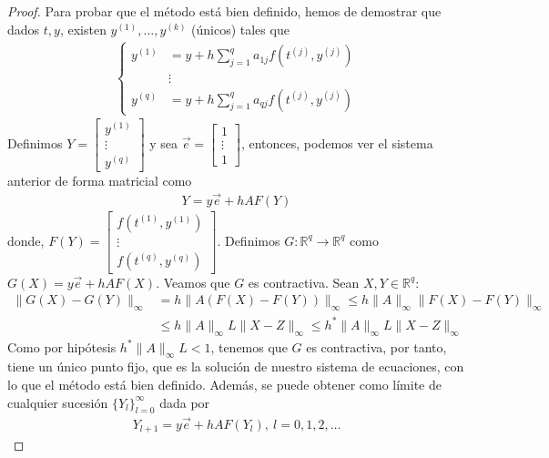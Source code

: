 \begin{proof}
Para probar que el método está bien definido, hemos de demostrar que dados $t,y$, existen $y^{(1)},\ldots,y^{(k)}$ (únicos) tales que
\begin{align*}
    \left\{ \begin{array}{lcc}
             y^{(1)} & = y + h\sum_{j=1}^{q}a_{1j}f(t^{(j)},y^{(j)})\\
            & \vdots \\
            y^{(q)} &= y + h\sum_{j=1}^{q}a_{qj}f(t^{(j)},y^{(j)})
             \end{array}
   \right.
\end{align*}
Definimos $Y = \begin{bmatrix}
y^{(1)}\\
\vdots \\
y^{(q)} 
\end{bmatrix}$ y sea $\overrightarrow{e} = \begin{bmatrix}
1\\
\vdots \\
1
\end{bmatrix}$, entonces, podemos ver el sistema anterior de forma matricial como
\begin{align*}
    Y = y\overrightarrow{e} + hAF(Y)
\end{align*}
donde, $F(Y) = \begin{bmatrix}
f(t^{(1)}, y^{(1)})\\
\vdots \\
f(t^{(q)},y^{(q)}) 
\end{bmatrix}$. Definimos $G: \mathbb{R}^q \longrightarrow \mathbb{R}^q$ como $G(X) = y\overrightarrow{e} + hAF(X)$. Veamos que $G$ es contractiva. Sean $X,Y \in \mathbb{R}^q$:
\begin{align*}
    \|G(X) - G(Y)\|_{\infty} &= h\|A(F(X) - F(Y))\|_{\infty} \leq h\|A\|_{\infty}\|F(X) - F(Y)\|_{\infty} \\
    & \leq h\|A\|_{\infty}L\|X-Z\|_{\infty} \leq h^*\|A\|_{\infty}L\|X-Z\|_{\infty}
\end{align*}
Como por hipótesis $h^*\|A\|_{\infty}L < 1$, tenemos que $G$ es contractiva, por tanto, tiene un único punto fijo, que es la solución de nuestro sistema de ecuaciones, con lo que el método está bien definido. Además, se puede obtener como límite de cualquier sucesión $\{Y_l\}_{l=0}^{\infty}$ dada por
\begin{align*}
    Y_{l+1} = y\overrightarrow{e} + hAF(Y_l), \ l =0,1,2,\ldots 
\end{align*}

\end{proof}
